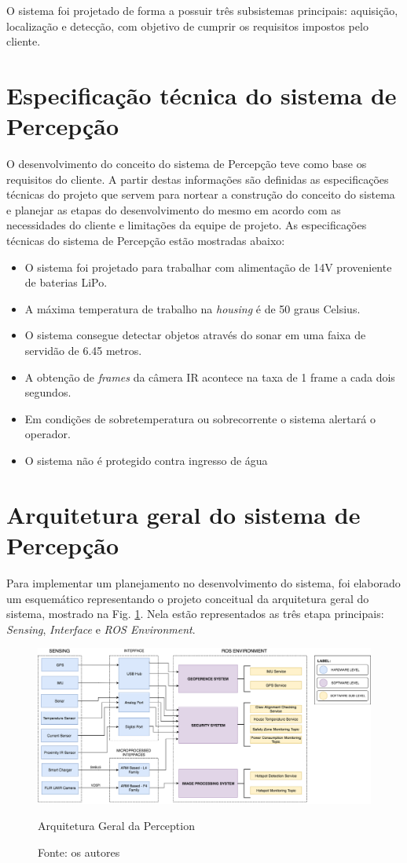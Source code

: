 O sistema foi projetado de forma a possuir três subsistemas principais: aquisição, localização e detecção, com objetivo de cumprir os requisitos impostos pelo cliente.

\section{Especificação técnica do sistema de Percepção}
\label{ssec:espt}

O desenvolvimento do conceito do sistema de Percepção teve como base os requisitos do cliente. A partir destas informações são definidas as especificações técnicas do projeto que servem para nortear a construção do conceito do sistema e planejar as etapas do desenvolvimento do mesmo em acordo com as necessidades do cliente e limitações da equipe de projeto. As especificações técnicas do sistema de Percepção estão mostradas abaixo:
\begin{itemize}
\item O sistema foi projetado para trabalhar com alimentação de 14V proveniente de baterias LiPo.
\item A máxima temperatura de trabalho na \textit{housing} é de 50 graus Celsius.
\item O sistema consegue detectar objetos através do sonar em uma faixa de servidão de 6.45 metros.
\item A obtenção de \textit{frames} da câmera IR acontece na taxa de 1 frame a cada dois segundos.
\item Em condições de sobretemperatura ou sobrecorrente o sistema alertará o operador.
\item O sistema não é protegido contra ingresso de água
\end{itemize} 

\section{Arquitetura geral do sistema de Percepção}
\label{ssec:arqg}

Para implementar um planejamento no desenvolvimento do sistema, foi elaborado um esquemático representando o projeto conceitual da arquitetura geral do sistema, mostrado na Fig. \ref{arqgeral}. Nela estão representados as três etapa principais: \textit{Sensing}, \textit{Interface} e \textit{ROS Environment}.

\begin{figure}[!ht]
\centering
\includegraphics[width=15cm]{Figures/ArquiteturaPerceptionv2.png}
\caption{Arquitetura Geral da Perception}\label{arqgeral}
\caption*{Fonte: os autores}
\end{figure}


